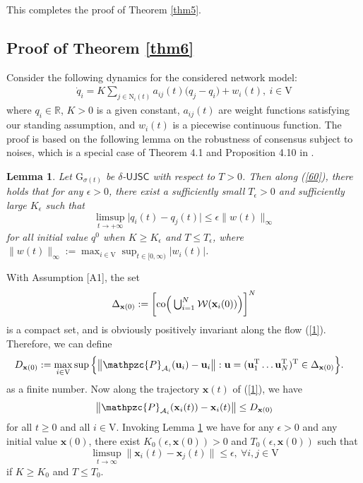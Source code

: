 \documentclass[a4paper, 11pt]{article}
\newcommand*\mcup{\mathbin{\mathpalette\mcupinn\relax}}
\newcommand*\mcupinn[2]{\vcenter{\hbox{$\mathsurround=0pt
  \ifx\displaystyle#1\textstyle\else#1\fi\bigcup$}}}
\def\T{^{\rm\tiny T}}
\newtheorem{lemma}{Lemma}
\begin{document}
 This completes the proof of Theorem \ref{thm5}.






\subsection{Proof of Theorem \ref{thm6}}

Consider the following dynamics for the considered network model:
\begin{align}\label{60}
\dot{q}_i=K\sum\limits_{j \in \mathrm{N}_i(t)}a_{ij}(t)\big(q_j-q_i\big)+w_i(t), \ i\in \mathrm{V}
\end{align}
where $q_i\in\mathbb{R}$, $K>0$ is a given constant, $a_{ij}(t)$ are weight functions satisfying our standing assumption, and  $w_i(t)$ is a piecewise continuous  function. The proof is based on the following lemma on the robustness of  consensus subject to noises, which is a special case of Theorem 4.1 and Proposition 4.10  in \cite{shisiam}.

\begin{lemma}\label{lemrobust}
Let $\mathrm{G}_{\sigma(t)}$ be $\delta$-$\mathsf{UJSC}$ with respect to $T>0$. Then along (\ref{60}), there holds that for any $\epsilon>0$,  there exist a sufficiently small $T_\epsilon>0$  and sufficiently large $K_\epsilon$ such that  $$
\limsup_{t\rightarrow +\infty} \big |q_i(t)-q_j(t)\big|\leq  \epsilon\|w(t)\|_{\infty}
$$
for all initial value $q^0$ when $K\geq K_\epsilon$ and $T\leq T_\epsilon$, where $ \|w(t)\|_{\infty}:= \max_{i \in\mathrm{V}} \sup_{t\in[0,\infty)} |w_i(t)|$.
\end{lemma}


With Assumption [A1], the set
$$
\Delta_{\mathbf{x}(0)}:= \bigg[ {\rm co} \Big( \mcup_{i=1}^N\mathcal{W}(\mathbf{x}_i(0))\Big)\bigg]^N
$$
is a compact set, and is obviously positively invariant along the flow (\ref{1}). Therefore, we can define
\begin{align*}
&D_{\mathbf{x}(0)}:= \max_{i\in \mathrm{V}} \sup \Big\{ \big\|\mathpzc{P}_{\mathcal{A}_i}(\mathbf{u}_i)-\mathbf{u}_i\big\|:  \mathbf{u}=(\mathbf{u}_1\T \dots \mathbf{u}_N\T)\T\in\Delta_{\mathbf{x}(0)} \Big\}.
\end{align*}
as a finite number. Now along the trajectory $\mathbf{x}(t)$ of (\ref{1}), we have
$$
\big\|\mathpzc{P}_{\mathcal{A}_i}(\mathbf{x}_i(t))-\mathbf{x}_i(t)\big\|\leq D_{\mathbf{x}(0)}
$$
for all $t\geq 0$ and all $i\in\mathrm{V}$. Invoking Lemma \ref{lemrobust} we have  for any $\epsilon>0$ and  any initial value $\mathbf{x}(0)$, there exist $K_0(\epsilon,\mathbf{x}(0))>0$ and $T_0(\epsilon,\mathbf{x}(0))$ such that
 $$
\limsup_{t\to \infty} \big\|\mathbf{x}_i(t)-\mathbf{x}_j(t)\big\|\leq \epsilon, \ \forall i,j\in\mathrm{V}
$$
if $K\geq K_0$ and $T\leq T_0$.
\end{document}
